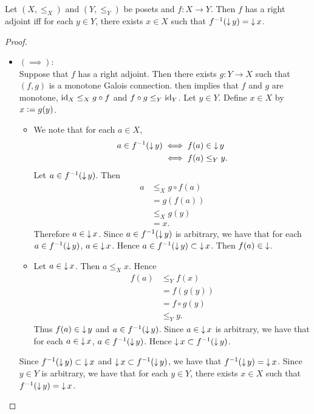 \documentclass{book}
\begin{document}
	\begin{ex} 
		Let $(X, \leq_X)$ and $(Y, \leq_Y)$ be posets and $f: X \rightarrow Y$. Then $f$ has a right adjoint iff for each $y \in Y$, there exists $x \in X$ such that $f^{-1}(\operatorname{\downarrow} y) = \operatorname{\downarrow} x$.
	\end{ex}
	
	\begin{proof}\
		\begin{itemize}
			\item $(\implies)$: \\
			Suppose that $f$ has a right adjoint. Then there exists $g:Y \rightarrow X$ such that $(f, g)$ is a monotone Galois connection.  \rex{} then implies that $f$ and $g$ are monotone, $\operatorname{id}_X \leq_X g \circ f$ and $f \circ g \leq_Y \operatorname{id}_Y$. Let $y \in Y$. Define $x \in X$ by $x \vcentcolon= g(y)$. 
			\begin{itemize}
				\item We note that for each $a \in X$,
				\begin{align*}
					a \in f^{-1}(\operatorname{\downarrow} y)
					& \iff f(a) \in \operatorname{\downarrow} y \\
					& \iff f(a) \leq_Y y.
				\end{align*}
				Let $a \in f^{-1}(\operatorname{\downarrow} y)$. Then 
				\begin{align*}
					a
					& \leq_X g \circ f(a) \\
					& = g(f(a)) \\
					& \leq_X g(y) \\
					& = x.
				\end{align*}
				Therefore $a \in \operatorname{\downarrow} x$. Since $a \in f^{-1}(\operatorname{\downarrow} y)$ is arbitrary, we have that for each $a \in f^{-1}(\operatorname{\downarrow} y)$, $a \in \operatorname{\downarrow} x$. Hence $a \in f^{-1}(\operatorname{\downarrow} y) \subset \operatorname{\downarrow} x$. 
				Then $f(a) \in \operatorname{\downarrow}$. 
				\item Let $a \in \operatorname{\downarrow} x$. Then $a \leq_X x$. Hence 
				\begin{align*}
					f(a)
					& \leq_Y f(x) \\
					& = f(g(y)) \\
					& = f \circ g(y) \\
					& \leq_Y y.
				\end{align*}
				Thus $f(a) \in \operatorname{\downarrow} y$ and $a \in f^{-1}(\operatorname{\downarrow} y)$. Since $a \in \operatorname{\downarrow} x$ is arbitrary, we have that for each $a \in \operatorname{\downarrow} x$, $a \in f^{-1}(\operatorname{\downarrow} y)$. Hence $\operatorname{\downarrow} x \subset f^{-1}(\operatorname{\downarrow} y)$.
			\end{itemize}
			Since $f^{-1}(\operatorname{\downarrow} y) \subset \operatorname{\downarrow} x$ and $\operatorname{\downarrow} x \subset f^{-1}(\operatorname{\downarrow} y)$, we have that $f^{-1}(\operatorname{\downarrow} y) = \operatorname{\downarrow} x$. Since $y \in Y$ is arbitrary, we have that for each $y \in Y$, there exists $x \in X$ such that $f^{-1}(\operatorname{\downarrow} y) = \operatorname{\downarrow} x$. 

\end{itemize}
\end{proof}
\end{document}
